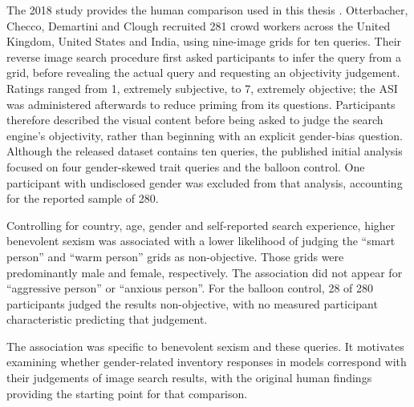 The 2018 study provides the human comparison used in this thesis
\cite{otterbacher2018sigir}. Otterbacher, Checco, Demartini and Clough
recruited 281 crowd workers across the United Kingdom, United States and
India, using nine-image grids for ten queries. Their reverse image search
procedure first asked participants to infer the query from a grid, before
revealing the actual query and requesting an objectivity judgement.
Ratings ranged from 1, extremely subjective, to 7, extremely objective;
the ASI was administered afterwards to reduce priming from its questions.
Participants therefore described the visual content before being asked to
judge the search engine's objectivity, rather than beginning with an explicit
gender-bias question. Although the released dataset contains ten queries,
the published initial analysis focused on four gender-skewed trait queries
and the balloon control. One participant with undisclosed gender was excluded
from that analysis, accounting for the reported sample of 280.

Controlling for country, age, gender and self-reported search experience,
higher benevolent sexism was associated with a lower likelihood of judging
the ``smart person'' and ``warm person'' grids as non-objective.
Those grids were predominantly male and female, respectively.
The association did not appear for ``aggressive person'' or ``anxious
person''. For the balloon control, 28 of 280 participants judged the
results non-objective, with no measured participant characteristic predicting
that judgement.

The association was specific to benevolent sexism and these queries.
It motivates examining whether gender-related inventory responses in models
correspond with their judgements of image search results, with the original
human findings providing the starting point for that comparison.

